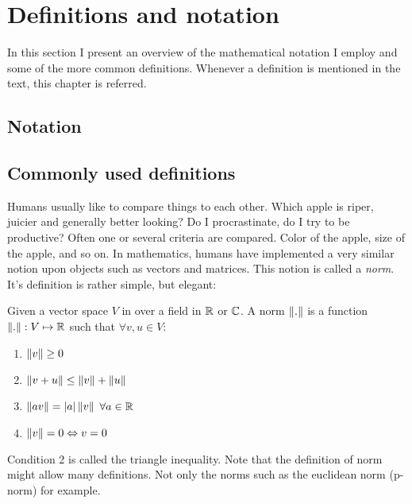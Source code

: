 \chapter*{Definitions and notation}

In this section I present an overview of the mathematical notation I employ and some of the more common definitions. Whenever a definition is mentioned in the text, this chapter is referred.

\section*{Notation}

\section*{Commonly used definitions}

Humans usually like to compare things to each other. Which apple is riper, juicier and generally better looking? Do I procrastinate, do I try to be productive? Often one or several criteria are compared. Color of the apple, size of the apple, and so on. In mathematics, humans have implemented a very similar notion upon objects such as vectors and matrices. This notion is called a \textit{norm}. It's definition is rather simple, but elegant:

\begin{defn} 
Given a vector space $V$ in over a field in $\mathbb{R}$ or $\mathbb{C}$. A norm $\left\lVert.\right\rVert$ is a function $\left\lVert.\right\rVert:V \mapsto \mathbb{R}$ such that $\forall v, u \in V$:
\begin{enumerate}
\item $\left\lVert v\right\rVert \geq 0$
\item $\left\lVert v + u\right\rVert \leq \left\lVert v\right\rVert + \left\lVert u\right\rVert$
\item $\left\lVert av\right\rVert = |a|\left\lVert v\right\rVert$ $\forall a \in \mathbb{R}$
\item $\left\lVert v\right\rVert = 0 \Leftrightarrow v = 0$
\end{enumerate}
Condition 2 is called the triangle inequality. Note that the definition of norm might allow many definitions. Not only the norms such as the euclidean norm (p-norm) for example.
\end{defn}

